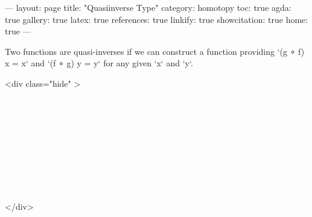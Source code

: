 ---
layout: page
title: "Quasiinverse Type"
category: homotopy
toc: true
agda: true
gallery: true
latex: true
references: true
linkify: true
showcitation: true
home: true
---

Two functions are quasi-inverses if we can construct a function providing
`(g ∘ f) x = x` and `(f ∘ g) y = y` for any given `x` and `y`.

<div class="hide" >
\begin{code}%
\>[0]\AgdaSymbol{\{-\#}\AgdaSpace{}%
\AgdaSpace{}%
\AgdaSpace{}%
\AgdaSymbol{\#-\}}\<%
\\
\>[0]\AgdaSpace{}%
\AgdaSpace{}%
\<%
\\
\>[0]\AgdaSpace{}%
\AgdaSpace{}%
\<%
\\
%
\\[\AgdaEmptyExtraSkip]%
\>[0]\AgdaSpace{}%
\AgdaSpace{}%
\<%
\\
\>[0]\AgdaSpace{}%
\AgdaSpace{}%
\<%
\\
%
\\[\AgdaEmptyExtraSkip]%
%
\\[\AgdaEmptyExtraSkip]%
\>[0]\AgdaSpace{}%
\AgdaSpace{}%
\<%
\end{code}
</div>

